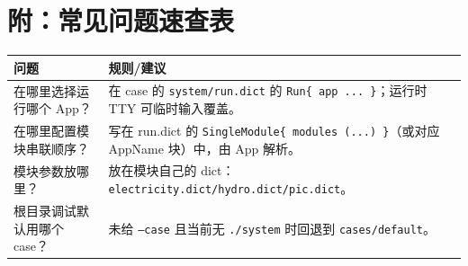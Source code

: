 \documentclass[UTF8,a4paper,11pt]{ctexart}
\begin{document}
\section*{附：常见问题速查表}
\begin{tabularx}{\textwidth}{>{\raggedright\arraybackslash}p{}X}
\toprule
\rowcolor{black!85}\color{white}\textbf{问题} & \color{white}\textbf{规则/建议}\\
\midrule
在哪里选择运行哪个 App？ &
在 case 的 \texttt{system/run.dict} 的 \texttt{Run\{ app ... \}}；运行时 TTY 可临时输入覆盖。\\
在哪里配置模块串联顺序？ &
写在 run.dict 的 \texttt{SingleModule\{ modules (...) \}}（或对应 AppName 块）中，由 App 解析。\\
模块参数放哪里？ &
放在模块自己的 dict：\texttt{electricity.dict/hydro.dict/pic.dict}。\\
根目录调试默认用哪个 case？ &
未给 \texttt{--case} 且当前无 \texttt{./system} 时回退到 \texttt{cases/default}。\\
\bottomrule
\end{tabularx}
\end{document}
